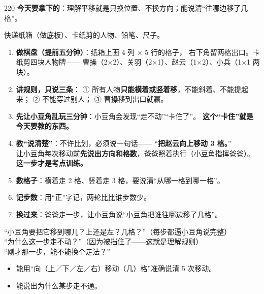 \begin{lesson}{2}{20}
\textbf{今天要拿下的}：理解平移就是只换位置、不换方向；能说清“往哪边移了几格”。

\begin{materials}
快递纸箱（做底板）、卡纸剪的人物、铅笔、尺子。
\end{materials}

\begin{enumerate}
  \item \textbf{做棋盘（提前五分钟）}：纸箱上画 4 列 $\times$ 5 行的格子，
        右下角留两格出口。卡纸剪四块人物牌——
        曹操（2$\times$2）、关羽（2$\times$1）、赵云（1$\times$2）、小兵（1$\times$1 两块）。
  \item \textbf{讲规则，只说三条}：
        ① 所有人物\textbf{只能横着或竖着移}，不能斜着、不能提起来；
        ② 不能穿过别人；
        ③ 曹操移到出口就赢。
  \item \textbf{先让小豆角乱玩三分钟}：小豆角会发现“走不动”“卡住了”。
        \textbf{这个“卡住”就是今天要教的东西。}
  \item \textbf{教“说清楚”}：不许比划，必须说一句话——
        “\textbf{把赵云向上移动 3 格。}”\\
        让小豆角每次移动前\textbf{先说出方向和格数}，爸爸照着执行（小豆角指挥爸爸）。
        \textbf{这一步才是考点训练。}
  \item \textbf{数格子}：横着走 2 格、竖着走 3 格，要说清“从哪一格到哪一格”。
  \item \textbf{记步数}：用“正”字记，两轮比比谁步数少。
  \item \textbf{换过来}：爸爸走一步，让小豆角说“小豆角把谁往哪边移了几格”。
\end{enumerate}

\begin{saybox}
“小豆角要把它移到哪儿？上还是左？几格？”（每步都逼小豆角说完整）\\
“为什么这一步走不动？”（因为被挡住了——这就是理解规则）\\
“刚才那一步，能不能换个走法？”
\end{saybox}

\begin{passbox}
\begin{itemize}
  \item 能用“向（上／下／左／右）移动（几）格”准确说清 5 次移动。
  \item 能说出为什么某步走不通。
\end{itemize}
\end{passbox}
\end{lesson}


